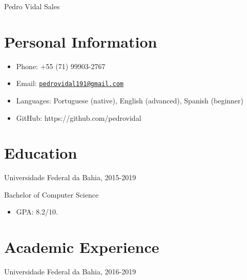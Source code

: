 \documentclass[letterpaper]{article}
\def\name{Pedro Vidal Sales}
\begin{document}
{\huge \name}


\vspace{0.25in}

    

\section*{Personal Information}
    \begin{itemize}
        \item Phone: +55 (71) 99903-2767
        \item Email: \href{mailto:pedrovidal191@gmail.com}{\tt pedrovidal191@gmail.com}
        \item Languages: Portuguese (native), English (advanced), Spanish (beginner)
        \item GitHub: https://github.com/pedrovidal
    \end{itemize}

\section*{Education}

  Universidade Federal da Bahia, 2015-2019
  
  Bachelor of Computer Science

  \begin{itemize}
    \item GPA: 8.2/10.
  \end{itemize}

\section*{Academic Experience}
  Universidade Federal da Bahia, 2016-2019
  
\end{document}
